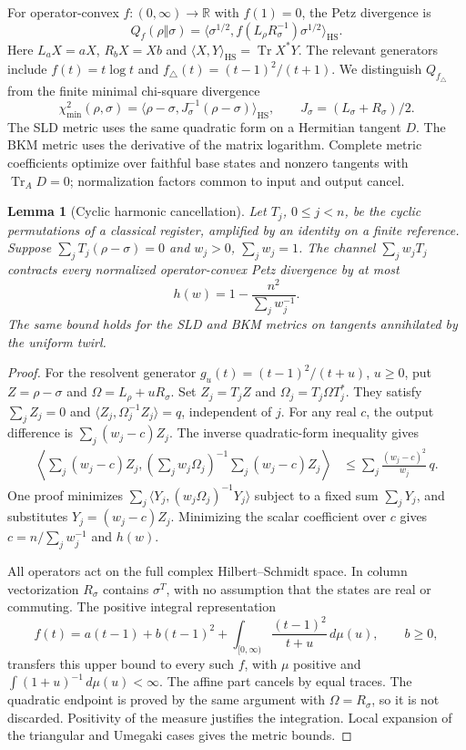 \documentclass[11pt]{article}
\newtheorem{lemma}[theorem]{Lemma}
\theoremstyle{remark}\newtheorem{remark}[theorem]{Remark}
\newcommand{\Tr}{\operatorname{Tr}}
\newcommand{\HS}{\mathrm{HS}}
\begin{document}
For operator-convex $f:(0,\infty)\to\mathbb R$ with $f(1)=0$, the Petz divergence is
\begin{equation}\label{eq:petz}
 Q_f(\rho\Vert\sigma)=
 \langle\sigma^{1/2},f(L_\rho R_\sigma^{-1})\sigma^{1/2}\rangle_{\HS}.
\end{equation}
Here $L_a X=aX$, $R_b X=Xb$ and $\langle X,Y\rangle_{\HS}=\Tr X^*Y$. The relevant generators include $f(t)=t\log t$ and $f_\triangle(t)=(t-1)^2/(t+1)$. We distinguish $Q_{f_\triangle}$ from the finite minimal chi-square divergence
\[
 \chi_{\min}^2(\rho,\sigma)=
 \langle\rho-\sigma,J_\sigma^{-1}(\rho-\sigma)\rangle_{\HS},
 \qquad J_\sigma=(L_\sigma+R_\sigma)/2.
\]
The SLD metric uses the same quadratic form on a Hermitian tangent $D$. The BKM metric uses the derivative of the matrix logarithm. Complete metric coefficients optimize over faithful base states and nonzero tangents with $\Tr_A D=0$; normalization factors common to input and output cancel.

\begin{lemma}[Cyclic harmonic cancellation]\label{lem:harmonic}
Let $T_j$, $0\leq j<n$, be the cyclic permutations of a classical register, amplified by an identity on a finite reference. Suppose $\sum_jT_j(\rho-\sigma)=0$ and $w_j>0$, $\sum_jw_j=1$. The channel $\sum_jw_jT_j$ contracts every normalized operator-convex Petz divergence by at most
\[
 h(w)=1-\frac{n^2}{\sum_jw_j^{-1}}.
\]
The same bound holds for the SLD and BKM metrics on tangents annihilated by the uniform twirl.
\end{lemma}
\begin{proof}
For the resolvent generator $g_u(t)=(t-1)^2/(t+u)$, $u\geq0$, put $Z=\rho-\sigma$ and $\Omega=L_\rho+uR_\sigma$. Set $Z_j=T_jZ$ and $\Omega_j=T_j\Omega T_j^*$. They satisfy $\sum_jZ_j=0$ and $\langle Z_j,\Omega_j^{-1}Z_j\rangle=q$, independent of $j$. For any real $c$, the output difference is $\sum_j(w_j-c)Z_j$. The inverse quadratic-form inequality gives
\begin{align*}
 \left\langle\sum_j(w_j-c)Z_j,
 \left(\sum_jw_j\Omega_j\right)^{-1}
 \sum_j(w_j-c)Z_j\right\rangle
 &\leq\sum_j\frac{(w_j-c)^2}{w_j}\,q.
\end{align*}
One proof minimizes $\sum_j\langle Y_j,(w_j\Omega_j)^{-1}Y_j\rangle$ subject to a fixed sum $\sum_jY_j$, and substitutes $Y_j=(w_j-c)Z_j$. Minimizing the scalar coefficient over $c$ gives $c=n/\sum_jw_j^{-1}$ and $h(w)$.

All operators act on the full complex Hilbert--Schmidt space. In column vectorization $R_\sigma$ contains $\sigma^T$, with no assumption that the states are real or commuting. The positive integral representation~\cite{HR}
\[
 f(t)=a(t-1)+b(t-1)^2+
 \int_{[0,\infty)}\frac{(t-1)^2}{t+u}\,d\mu(u),\qquad b\geq0,
\]
transfers this upper bound to every such $f$, with $\mu$ positive and $\int(1+u)^{-1}\,d\mu(u)<\infty$. The affine part cancels by equal traces. The quadratic endpoint is proved by the same argument with $\Omega=R_\sigma$, so it is not discarded. Positivity of the measure justifies the integration. Local expansion of the triangular and Umegaki cases gives the metric bounds.
\end{proof}
\end{document}
